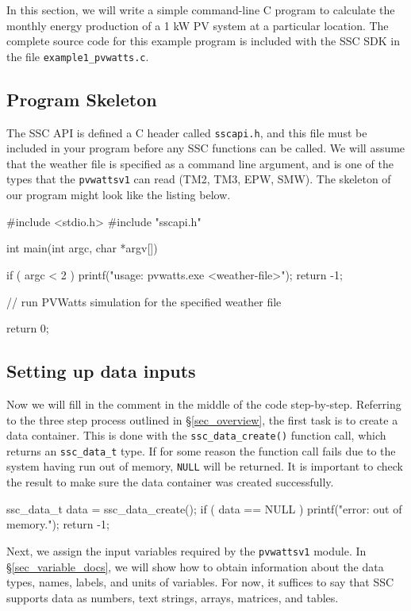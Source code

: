 \documentclass{article}
\begin{document}
In this section, we will write a simple command-line C program to calculate the monthly energy production of a 1 kW PV system at a particular location.  The complete source code for this example program is included with the SSC SDK in the file \texttt{example1\_pvwatts.c}.

\subsection{Program Skeleton}

The SSC API is defined a C header called \texttt{sscapi.h}, and this file must be included in your program before any SSC functions can be called.  We will assume that the weather file is specified as a command line argument, and is one of the types that the \texttt{pvwattsv1} can read (TM2, TM3, EPW, SMW).  The skeleton of our program might look like the listing below.

\begin{verbatimtab}[4]
#include <stdio.h>
#include "sscapi.h"

int main(int argc, char *argv[])
{
	if ( argc < 2 )
	{
		printf("usage: pvwatts.exe <weather-file>\n");
		return -1;
	}
 
	// run PVWatts simulation for the specified weather file
	
	return 0;
}
\end{verbatimtab}

\subsection{Setting up data inputs}

Now we will fill in the comment in the middle of the code step-by-step.  Referring to the three step process outlined in \S\ref{sec_overview}, the first task is to create a data container.  This is done with the \texttt{ssc\_data\_create()} function call, which returns an \texttt{ssc\_data\_t} type.  If for some reason the function call fails due to the system having run out of memory, \texttt{NULL} will be returned.  It is important to check the result to make sure the data container was created successfully.

\begin{verbatimtab}[4]
	ssc_data_t data = ssc_data_create();
	if ( data == NULL )
	{
		printf("error: out of memory.\n");
		return -1;
	}
\end{verbatimtab}

Next, we assign the input variables required by the \texttt{pvwattsv1} module.  In \S\ref{sec_variable_docs}, we will show how to obtain information about the data types, names, labels, and units of variables.  For now, it suffices to say that SSC supports data as numbers, text strings, arrays, matrices, and tables.
\end{document}
